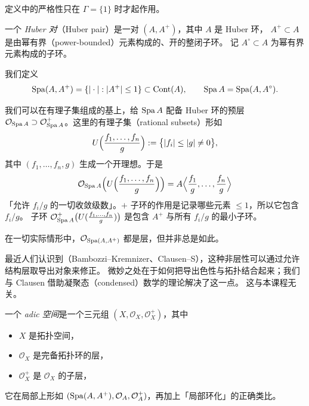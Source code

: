 \begin{example}
定义中的严格性只在 $\Gamma=\{1\}$ 时才起作用。
\end{example}

\begin{definition}
一个 \emph{Huber 对}（Huber pair）是一对 $(A,A^+)$，其中 $A$ 是 Huber 环，
$A^+\subset A$ 是由幂有界（power-bounded）元素构成的、开的整闭子环。
记 $A^\circ\subset A$ 为幂有界元素构成的子环。
\end{definition}

我们定义
\[
\operatorname{Spa}(A,A^+)=\{|\cdot|:|A^+|\le1\}\subset\mathrm{Cont}(A),\qquad
\operatorname{Spa} A=\operatorname{Spa}(A,A^\circ).
\]

我们可以在有理子集组成的基上，给 $\operatorname{Spa} A$ 配备 Huber 环的预层
$\mathcal{O}_{\operatorname{Spa} A}\supset\mathcal{O}^+_{\operatorname{Spa} A}$。这里的有理子集（rational subsets）形如
\[
U\Bigl(\frac{f_1,\dots,f_n}{g}\Bigr):=\bigl\{|f_i|\le|g|\ne0\bigr\},
\]
其中 $(f_1,\dots,f_n,g)$ 生成一个开理想。于是
\[
\mathcal{O}_{\operatorname{Spa} A}\Bigl(U\Bigl(\frac{f_1,\dots,f_n}{g}\Bigr)\Bigr)
=A\Bigl\langle\frac{f_1}{g},\dots,\frac{f_n}{g}\Bigr\rangle
\]
「允许 $f_i/g$ 的一切收敛级数」。$+$ 子环的作用是记录哪些元素 $\le1$，所以它包含 $f_i/g$。
子环 $\mathcal{O}^+_{\operatorname{Spa} A}\bigl(U(\frac{f_1,\dots,f_n}{g})\bigr)$ 是包含 $A^+$ 与所有 $f_i/g$ 的最小子环。

\begin{theorem}[Huber 等]
在一切实际情形中，$\mathcal{O}_{\operatorname{Spa}(A,A^+)}$ 都是层，但并非总是如此。
\end{theorem}

\begin{center}
\end{center}

\begin{remark}
最近人们认识到（Bambozzi--Kremnizer、Clausen--S），这种非层性可以通过允许结构层取导出对象来修正。
微妙之处在于如何把导出色性与拓扑结合起来；我们与 Clausen 借助凝聚态（condensed）数学的理论解决了这一点。
这与本课程无关。
\end{remark}

\begin{definition}
一个 \emph{adic 空间}是一个三元组 $(X,\mathcal{O}_X,\mathcal{O}^+_X)$，其中
\begin{itemize}
  \item $X$ 是拓扑空间，
  \item $\mathcal{O}_X$ 是完备拓扑环的层，
  \item $\mathcal{O}^+_X$ 是 $\mathcal{O}_X$ 的子层，
\end{itemize}
它在局部上形如 $(\operatorname{Spa}(A,A^+),\mathcal{O}_A,\mathcal{O}^+_A)$，再加上「局部环化」的正确类比。
\end{definition}

